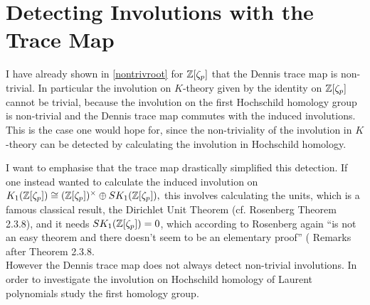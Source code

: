 
\section{Detecting Involutions with the Trace Map}
I have already shown in \ref{nontrivroot} for $\mathbb{Z}\lbrack \zeta_p\rbrack$ that the Dennis trace map is non-trivial. In particular the
involution on $K$-theory given by the identity on $\mathbb{Z}\lbrack \zeta_p \rbrack$ cannot be trivial, because the involution on the first
Hochschild homology group is non-trivial and the Dennis trace map commutes with the induced involutions. This is the case one would
hope for, since the non-triviality of the involution in $K$-theory can be detected by calculating the involution in Hochschild homology.

I want to emphasise that the trace map drastically simplified this detection. If one instead wanted to calculate the
induced involution on $K_1(\mathbb{Z}\lbrack \zeta_p\rbrack)\cong (\mathbb{Z}\lbrack \zeta_p\rbrack)^\times \oplus SK_1(\mathbb{Z}\lbrack \zeta_p\rbrack),$
this involves calculating the units, which is a famous classical result, the Dirichlet Unit Theorem
(cf. Rosenberg \cite{rosenberg1994algebraic} Theorem 2.3.8), and it needs $SK_1(\mathbb{Z}\lbrack \zeta_p\rbrack)=0$,
 which according to Rosenberg again ``is not an easy theorem and there doesn't seem to be an elementary proof'' (\cite{rosenberg1994algebraic} Remarks
after Theorem 2.3.8.\\[2ex]

However the Dennis trace map does not always detect non-trivial involutions. In order to investigate the involution on Hochschild homology of
Laurent polynomials study the first homology group.

